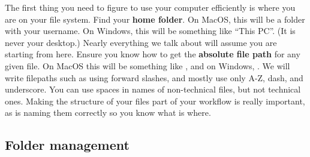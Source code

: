 
The first thing you need to figure to use your computer efficiently is where you are on your file system.
Find your \textbf{home folder}. On MacOS, this will be a folder with your username.
On Windows, this will be something like ``This PC''. (It is never your desktop.)
Nearly everything we talk about will assume you are starting from here.
Ensure you know how to get the \textbf{absolute file path} for any given file.
On MacOS this will be something like ,
and on Windows, .
We will write filepaths such as 
using forward slashes, and mostly use only A-Z, dash, and underscore.
You can use spaces in names of non-technical files, but not technical ones.
Making the structure of your files part of your workflow is really important,
as is naming them correctly so you know what is where.

\subsection{Folder management}

